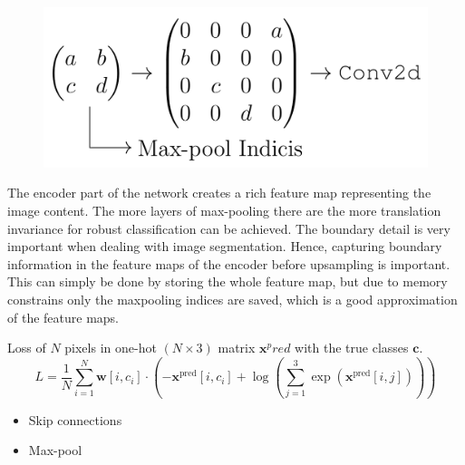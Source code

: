 \documentclass[
]{dtuposter}
\begin{document}
\begin{dtupostercontent}
\begin{figure}
	\centering
	\begin{fadebox}
	\includegraphics[width=1\linewidth]{pool}
	
	\end{fadebox}
	\label{fig:maxpool}
\end{figure}
The encoder part of the network creates a rich feature map representing the image content. The more 
layers of max-pooling there are the more translation invariance for robust 
classification can be achieved. The boundary detail is very important when 
dealing with image segmentation. Hence, capturing boundary information in 
the feature maps of the encoder before upsampling is important. This can 
simply be done by storing the whole feature map, but due to memory 
constrains only the maxpooling indices are saved, which is a good 
approximation of the feature maps. 


Loss of \(N\) pixels in one-hot \((N \times  3)\) matrix \(\mathbf x^pred\) with the true classes \(\mathbf c\).
\[
L = \frac 1 N \sum_{i=1}^{N} \mathbf{w}[i, c_i]  \cdot 
\left( 
-\mathbf x^\text{pred}[i, c_i] + \log
\left(
\sum_{j=1}^{3}\exp(\mathbf x^\text{pred}[i, j])
\right)
\right)
\]

\begin{itemize}
	\item Skip connections
	\item Max-pool
\end{itemize}



\end{dtupostercontent}
\end{document}
